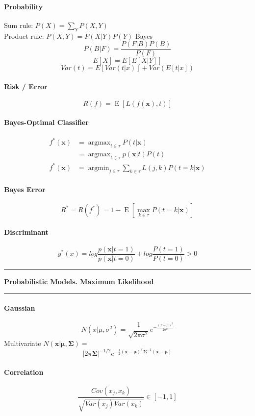 \documentclass[7pt]{scrartcl}
\newlength{\secskip}
\renewcommand{\section}[1]{
  \vspace{\secskip}
  \hrule\vspace{.4em}
  \textbf{#1}
  \vspace{.4em}
  \hrule
  \vspace{\secskip}
}
\DeclareMathOperator*{\argmax}{argmax}
\DeclareMathOperator*{\argmin}{argmin}
\DeclareMathOperator{\E}{E}
\renewcommand{\vec}{\mathbf}
\begin{document}
\begin{multicols}{4}
\paragraph{Probability}
\[\]
Sum rule: $P(X) = \sum_Y P(X,Y)$\\
Product rule: $P(X,Y) = P(X|Y)P(Y)$
Bayes  \[P(B|F) = \frac{P(F|B)P(B)}{P(F)}\]
\[E[X] = E[E[X|Y]]\]
\[Var(t) = E[Var(t|x)] + Var(E[t|x]) \]
\paragraph{Risk / Error}
\[ R(f) = \E \left [ L(f(\vec x), t) \right ] \]

\paragraph{Bayes-Optimal Classifier}
\begin{align*}
f^*(\vec x) &= \argmax_{t \in \tau} P(t|\vec x) \\ 
&= \argmax_{t \in \tau} p(\vec x|t) P(t) \\
f^*(\vec x) &= \argmin_{j \in \tau} \sum_{k \in \tau} L(j,k) P(t = k | \vec x) \end{align*}

\paragraph{Bayes Error}
\[ R^* = R(f^*) = 1 - \E \left [ \max_{k\in\tau} P(t = k | \vec x) \right ] \]


\paragraph{Discriminant}
\[y^*(x) = log \frac{p(\vec{x}|t=1)}{p(\vec{x}|t=0)} + log \frac{P(t=1)}{P(t=0)} > 0\]
\section{Probabilistic Models. Maximum Likelihood}

\paragraph{Gaussian}
\[N(x|\mu,\sigma^2) = \frac{1}{\sqrt{2\pi\sigma^2}} e^{-\frac{(x-\mu)^2}{2\sigma^2}}\]
Multivariate $N(\vec{x}|\vec{\mu},\vec{\Sigma}) =$
\[|2\pi\vec{\Sigma}|^{-1/2} e^{-\frac{1}{2}(\vec{x}-\vec{\mu})^T\vec{\Sigma}^{-1}(\vec{x}-\vec{\mu})}\]

\paragraph{Correlation}
\[\frac{Cov(x_j,x_k)}{\sqrt{Var(x_j)Var(x_k)}} \in [-1,1]\]


\end{multicols}
\end{document}
